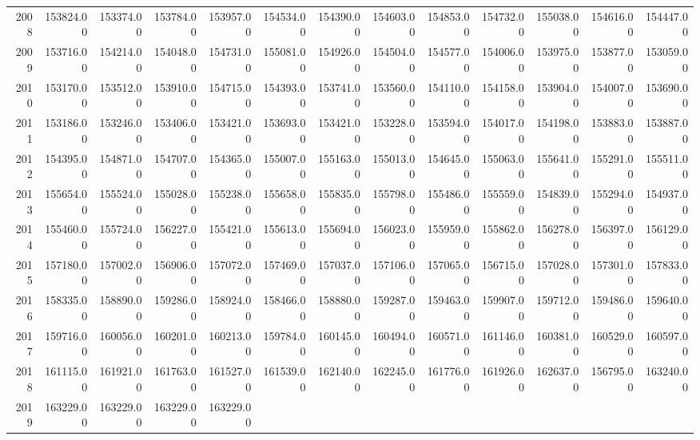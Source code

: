 \begin{longtable}{rrrrrrrrrrrrr}
  2008 & 153824.00 & 153374.00 & 153784.00 & 153957.00 & 154534.00 & 154390.00 & 154603.00 & 154853.00 & 154732.00 & 155038.00 & 154616.00 & 154447.00 \\ 
  2009 & 153716.00 & 154214.00 & 154048.00 & 154731.00 & 155081.00 & 154926.00 & 154504.00 & 154577.00 & 154006.00 & 153975.00 & 153877.00 & 153059.00 \\ 
  2010 & 153170.00 & 153512.00 & 153910.00 & 154715.00 & 154393.00 & 153741.00 & 153560.00 & 154110.00 & 154158.00 & 153904.00 & 154007.00 & 153690.00 \\ 
  2011 & 153186.00 & 153246.00 & 153406.00 & 153421.00 & 153693.00 & 153421.00 & 153228.00 & 153594.00 & 154017.00 & 154198.00 & 153883.00 & 153887.00 \\ 
  2012 & 154395.00 & 154871.00 & 154707.00 & 154365.00 & 155007.00 & 155163.00 & 155013.00 & 154645.00 & 155063.00 & 155641.00 & 155291.00 & 155511.00 \\ 
  2013 & 155654.00 & 155524.00 & 155028.00 & 155238.00 & 155658.00 & 155835.00 & 155798.00 & 155486.00 & 155559.00 & 154839.00 & 155294.00 & 154937.00 \\ 
  2014 & 155460.00 & 155724.00 & 156227.00 & 155421.00 & 155613.00 & 155694.00 & 156023.00 & 155959.00 & 155862.00 & 156278.00 & 156397.00 & 156129.00 \\ 
  2015 & 157180.00 & 157002.00 & 156906.00 & 157072.00 & 157469.00 & 157037.00 & 157106.00 & 157065.00 & 156715.00 & 157028.00 & 157301.00 & 157833.00 \\ 
  2016 & 158335.00 & 158890.00 & 159286.00 & 158924.00 & 158466.00 & 158880.00 & 159287.00 & 159463.00 & 159907.00 & 159712.00 & 159486.00 & 159640.00 \\ 
  2017 & 159716.00 & 160056.00 & 160201.00 & 160213.00 & 159784.00 & 160145.00 & 160494.00 & 160571.00 & 161146.00 & 160381.00 & 160529.00 & 160597.00 \\ 
  2018 & 161115.00 & 161921.00 & 161763.00 & 161527.00 & 161539.00 & 162140.00 & 162245.00 & 161776.00 & 161926.00 & 162637.00 & 156795.00 & 163240.00 \\ 
  2019 & 163229.00 & 163229.00 & 163229.00 & 163229.00 &  &  &  &  &  &  &  &  \\ 
   \hline
\hline
\end{longtable}
